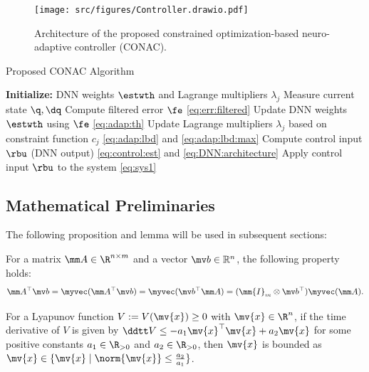 \documentclass[journal]{IEEEtran}
\begin{document}
\begin{figure}[!t]
    \centering
    \texttt{[image: src/figures/Controller.drawio.pdf]}
    \caption{Architecture of the proposed constrained optimization-based neuro-adaptive controller (CONAC).}
    \label{fig:ctrl:diagram}
\end{figure}

\begin{algorithm}[!t]
    \caption{Proposed CONAC Algorithm}\label{alg:CONAC}
    \begin{algorithmic}[1]
        \STATE \textbf{Initialize:} DNN weights $\estwth$ and Lagrange multipliers $\lambda_j$
            \STATE Measure current state $\q,\dq$
            \STATE Compute filtered error $\fe$ \eqref{eq:err:filtered}
            \STATE Update DNN weights $\estwth$ using $\fe$ \eqref{eq:adap:th}
            \STATE Update Lagrange multipliers $\lambda_j$ based on constraint function $c_j$ \eqref{eq:adap:lbd} and \eqref{eq:adap:lbd:max}
            \STATE Compute control input $\rbu$ (DNN output) \eqref{eq:control:est} and \eqref{eq:DNN:architecture}
            \STATE Apply control input $\rbu$ to the system \eqref{eq:sys1}
        \ENDFOR
    \end{algorithmic}
\end{algorithm}

\subsection{Mathematical Preliminaries}\label{sec:sub:math preliminaries}

The following proposition and lemma will be used in subsequent sections:

\begin{propsit} \label{propsit:kron}
	For a matrix $\mm A\in\R^{n\times m}$ and a vector $\mv b\in\mathbb R^n$, the following property holds:
	\begin{equation}
		\mm A^\top \mv b 
		= 
		\myvec(\mm A^\top\mv b)
		=
		\myvec(\mv b^\top\mm A)
		= 
		(\mm{I}_{m}\otimes \mv b^\top) \myvec(\mm A)
		.
	\end{equation}
\end{propsit}


\begin{lem} \label{lem:stable:set}
    For a Lyapunov function $V:=V(\mv{x})\ge0$ with $\mv{x}\in\R^n$, if the time derivative of $V$ is given by $\ddtt V\le -a_1 \mv{x}^\top \mv{x} + a_2 \mv{x}$ for some positive constants $a_1\in\R_{>0}$ and $a_2\in\R_{>0}$, then $\mv{x}$ is bounded as $\mv{x}\in\{\mv{x}\mid\norm{\mv{x}}\le\tfrac{a_2}{a_1}\}$.
\end{lem}
\end{document}
